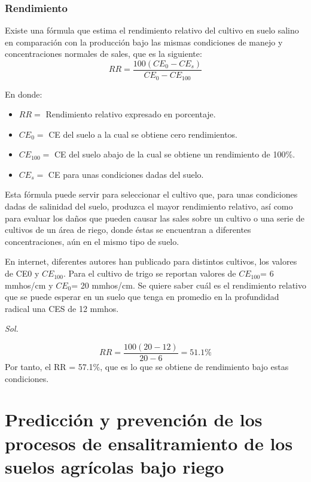 \subsubsection{Rendimiento}
Existe una fórmula que estima el rendimiento relativo del cultivo en suelo salino en comparación con la producción bajo las mismas condiciones de manejo y concentraciones normales de sales, que es la siguiente:
\begin{equation}
    RR = \frac{100\left(CE_0 - CE_s\right)}{CE_0-CE_{100}}
\end{equation}
\begin{notation}
    En donde:
    \begin{itemize}
        \item $RR =$ Rendimiento relativo expresado en porcentaje.
        \item $CE_0 =$ CE del suelo a la cual se obtiene cero rendimientos.
        \item $CE_{100} =$ CE del suelo abajo de la cual se obtiene un rendimiento de 100\%.
        \item $CE_s =$ CE para unas condiciones dadas del suelo.
    \end{itemize}
\end{notation}
Esta fórmula puede servir para seleccionar el cultivo que, para unas condiciones dadas de salinidad del suelo, produzca el mayor rendimiento relativo, así como para evaluar los daños que pueden causar las sales sobre un cultivo o una serie de cultivos de un área de riego, donde éstas se encuentran a diferentes concentraciones, aún en el mismo tipo de suelo.
\begin{example}
    En internet, diferentes autores han publicado para distintos cultivos, los valores de CE0 y $CE_{100}$. Para el cultivo de trigo se reportan valores de $CE_{100}$= 6 mmhos/cm y $CE_0$= 20 mmhos/cm. Se quiere saber cuál es el rendimiento relativo que se puede esperar en un suelo que tenga en promedio en la profundidad radical una CES de 12 mmhos.

    \textit{ Sol. }

    \begin{equation*}
        RR = \frac{100\left(20 - 12\right)}{20- 6} = 51.1\%
    \end{equation*}
    Por tanto, el RR = 57.1\%, que es lo que se obtiene de rendimiento bajo estas condiciones.
\end{example}
\section{Predicción y prevención de los procesos de ensalitramiento de los suelos agrícolas bajo riego}

